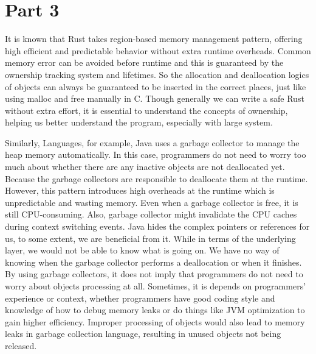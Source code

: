 \documentclass[10pt,a4paper,twocolumn]{article}
\begin{document}
\section*{Part 3}


It is known that Rust takes region-based memory management pattern, offering high efficient and predictable behavior without extra runtime overheads. Common memory error can be avoided before runtime and this is guaranteed by the ownership tracking system and lifetimes. So the allocation and deallocation logics of objects can always be guaranteed to be inserted in the correct places, just like using malloc and free manually in C. Though generally we can write a safe Rust without extra effort, it is essential to understand the concepts of ownership, helping us better understand the program, especially with large system. 

Similarly, Languages, for example, Java uses a garbage collector to manage the heap memory automatically. In this case, programmers do not need to worry too much about whether there are any inactive objects are not deallocated yet. Because the garbage collectors are responsible to deallocate them at the runtime. However, this pattern introduces high overheads at the runtime which is unpredictable and wasting memory. Even when a garbage collector is free, it is still CPU-consuming. Also, garbage collector might invalidate the CPU caches during context switching events. Java hides the complex pointers or references for us, to some extent, we are beneficial from it. While in terms of the underlying layer, we would not be able to know what is going on. We have no way of knowing when the garbage collector performs a deallocation or when it finishes. By using garbage collectors, it does not imply that programmers do not need to worry about objects processing at all. Sometimes, it is depends on programmers' experience or context, whether programmers have good coding style and knowledge of how to debug memory leaks or do things like JVM optimization to gain higher efficiency. Improper processing of objects would also lead to memory leaks in garbage collection language, resulting in unused objects not being released. 
\end{document}
